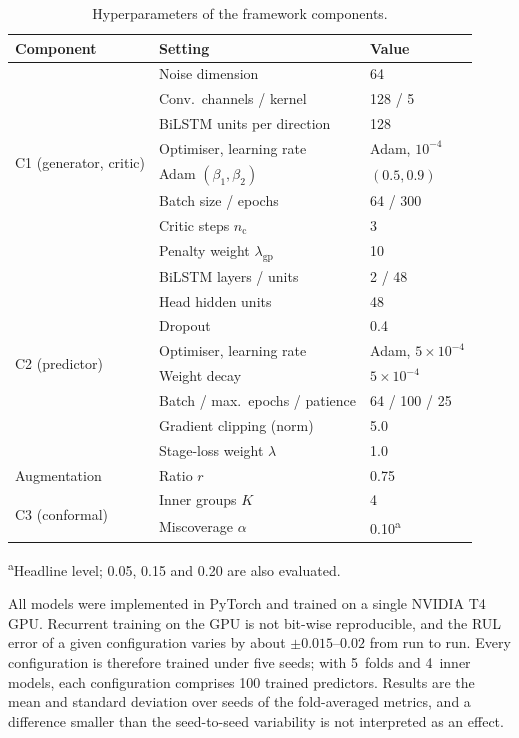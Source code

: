 \documentclass[review]{elsarticle}
\begin{document}
\begin{table}[htbp]
\centering
\caption{Hyperparameters of the framework components.}
\label{tab:hyperparams}
\footnotesize
\renewcommand{\arraystretch}{1.15}
\begin{tabular}{lll}
\toprule
\textbf{Component} & \textbf{Setting} & \textbf{Value} \\
\midrule
\multirow{8}{*}{C1 (generator, critic)}
 & Noise dimension & 64 \\
 & Conv.\ channels / kernel & 128 / 5 \\
 & BiLSTM units per direction & 128 \\
 & Optimiser, learning rate & Adam, $10^{-4}$ \\
 & Adam $(\beta_1, \beta_2)$ & $(0.5, 0.9)$ \\
 & Batch size / epochs & 64 / 300 \\
 & Critic steps $n_{\mathrm{c}}$ & 3 \\
 & Penalty weight $\lambda_{\mathrm{gp}}$ & 10 \\
\midrule
\multirow{8}{*}{C2 (predictor)}
 & BiLSTM layers / units & 2 / 48 \\
 & Head hidden units & 48 \\
 & Dropout & 0.4 \\
 & Optimiser, learning rate & Adam, $5 \times 10^{-4}$ \\
 & Weight decay & $5 \times 10^{-4}$ \\
 & Batch / max.\ epochs / patience & 64 / 100 / 25 \\
 & Gradient clipping (norm) & 5.0 \\
 & Stage-loss weight $\lambda$ & 1.0 \\
\midrule
Augmentation & Ratio $r$ & 0.75 \\
\multirow{2}{*}{C3 (conformal)} & Inner groups $K$ & 4 \\
 & Miscoverage $\alpha$ & 0.10\textsuperscript{a} \\
\bottomrule
\end{tabular}

\vspace{2pt}
\raggedright\scriptsize \textsuperscript{a}Headline level; 0.05, 0.15
and 0.20 are also evaluated.
\end{table}

All models were implemented in PyTorch and trained on a single NVIDIA
T4 GPU. Recurrent training on the GPU is not bit-wise reproducible, and
the RUL error of a given configuration varies by about
$\pm 0.015$--$0.02$ from run to run. Every configuration is therefore
trained under five seeds; with 5~folds and 4~inner models, each
configuration comprises 100 trained predictors. Results are the mean
and standard deviation over seeds of the fold-averaged metrics, and a
difference smaller than the seed-to-seed variability is not interpreted
as an effect.
\end{document}
